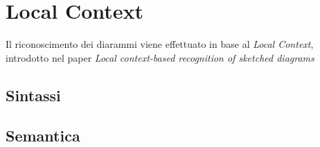 \chapter{Local Context}\label{ch:chapter3}
    Il riconoscimento dei diarammi viene effettuato in base al \textit{Local Context}, introdotto nel paper \textit{Local context-based recognition of sketched diagrams}\cite{localcontext_recognition}
    \section{Sintassi}
    \section{Semantica}